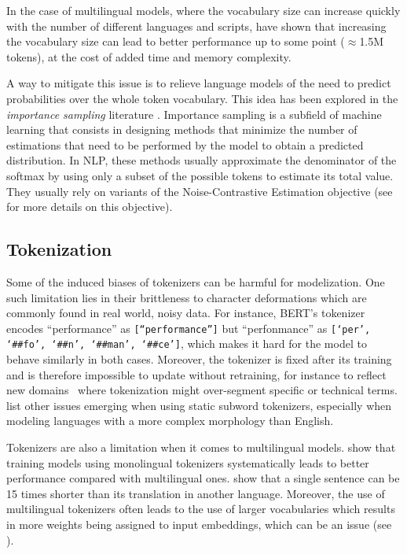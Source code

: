 In the case of multilingual models, where the vocabulary size can increase quickly with the number of different languages and scripts, \citet{liang2023xlmv} have shown that increasing the vocabulary size can lead to better performance up to some point ($\approx$1.5M tokens), at the cost of added time and memory complexity.

A way to mitigate this issue is to relieve language models of the need to predict probabilities over the whole token vocabulary. This idea has been explored in the \textit{importance sampling} literature \citep{quick_train_bengio_03,mnih2012fast,jean-etal-2015-using, ma-collins-2018-noise}. Importance sampling is a subfield of machine learning that consists in designing methods that minimize the number of estimations that need to be performed by the model to obtain a predicted distribution. In NLP, these methods usually approximate the denominator of the softmax by using only a subset of the possible tokens to estimate its total value. They usually rely on variants of the Noise-Contrastive Estimation objective \citep{nce} (see  for more details on this objective).



\subsection{Tokenization}

Some of the induced biases of tokenizers can be harmful for modelization. One such limitation lies in their brittleness to character deformations which are commonly found in real world, noisy data. For instance, BERT's tokenizer~\cite{devlin-etal-2019-bert} encodes ``performance'' as \texttt{[``performance'']} but \mbox{``perfonmance''} as \texttt{[`per', `\#\#fo', `\#\#n', `\#\#man', `\#\#ce']}, which makes it hard for the model to behave similarly in both cases. Moreover, the tokenizer is fixed after its training and is therefore impossible to update without retraining, for instance to reflect new domains~\cite{el-boukkouri-etal-2020-characterbert} where tokenization might over-segment specific or technical terms. \citet{clark2022canine} list other issues emerging when using static subword tokenizers, especially when modeling languages with a more complex morphology than English.

Tokenizers are also a limitation when it comes to multilingual models. \citet{rust-etal-2021-good} show that training models using monolingual tokenizers systematically leads to better performance compared with multilingual ones. \citet{NEURIPS2023_74bb24dc} show that a single sentence can be 15 times shorter than its translation in another language. Moreover, the use of multilingual tokenizers often leads to the use of larger vocabularies which results in more weights being assigned to input embeddings, which can be an issue (see ).

